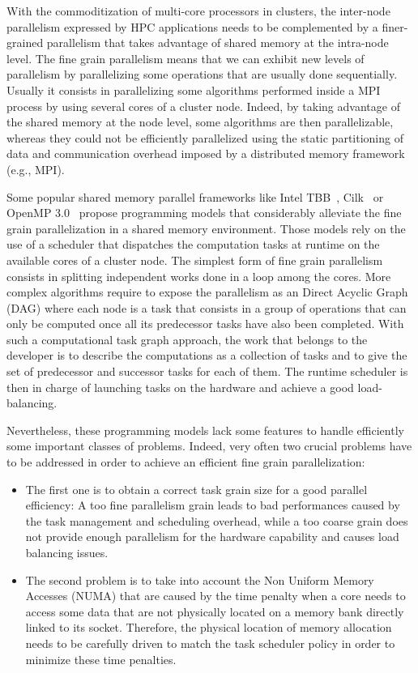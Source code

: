 With the commoditization of multi-core processors in clusters, the inter-node parallelism expressed by HPC applications needs to be complemented by a finer-grained parallelism that takes advantage of shared memory at the intra-node level.
%
The fine grain parallelism means that we can exhibit new levels of parallelism by parallelizing some operations that are usually done sequentially.
%
Usually it consists in parallelizing some algorithms performed inside a MPI process by using several cores of a cluster node.
%
Indeed, by taking advantage of the shared memory at the node level, some algorithms are then parallelizable, whereas they could not be efficiently parallelized using the static partitioning of data and communication overhead imposed by a distributed memory framework (e.g., MPI).


Some popular shared memory parallel frameworks like Intel TBB~\cite{Intel::TBB},
Cilk~\cite{cilk} or OpenMP 3.0~\cite{openmp08} propose programming models that
considerably alleviate the fine grain parallelization in a shared memory environment.
Those models rely on the use of a scheduler that dispatches the computation tasks
at runtime on the available cores of a cluster node. The simplest form of fine grain
parallelism consists in splitting independent works done in a loop among the cores.
More complex algorithms require to expose the parallelism as an Direct Acyclic Graph (DAG)
where each node is a task that consists in a group of operations that
can only be computed once all its predecessor tasks have also been completed.
With such a computational task graph approach, the work that belongs to the developer
is to describe the computations as a collection of tasks and to give  the set of
predecessor and successor tasks for each of them. The runtime scheduler is then
in charge of launching tasks on the hardware and achieve a good load-balancing.

Nevertheless, these programming models lack some features to handle efficiently
some important classes of problems.
Indeed, very often two crucial problems have to be addressed in order to achieve
an efficient fine grain parallelization:
\begin{itemize}
\item The first one is to obtain a correct task grain size for a good parallel
  efficiency: A too fine parallelism grain leads to bad performances caused by
  the task management and scheduling overhead, while a too coarse grain does not
  provide enough parallelism for the hardware capability and causes load balancing issues.
\item The second problem is to take into account the Non Uniform Memory Accesses (NUMA)
  that are caused by the time penalty when a core needs to access some data that
  are not physically located on a memory bank directly linked to its socket.
  Therefore, the physical location of memory allocation needs to be carefully driven
  to match the task scheduler policy in order to minimize these time penalties.
\end{itemize}

